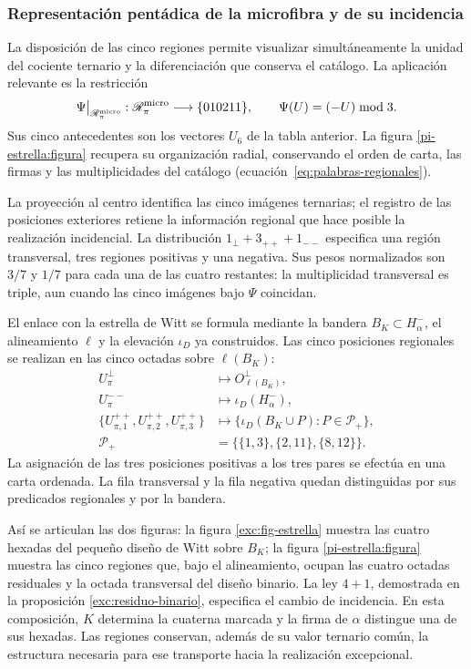 \subsubsection{Representación pentádica de la microfibra y de su incidencia}
\label{pi-estrella:desarrollo}

La disposición de las cinco regiones permite visualizar simultáneamente
la unidad del cociente ternario y la diferenciación que conserva el
catálogo. La aplicación relevante es la restricción
\[
 \Psi\big|_{\mathscr R_\pi^{\rm micro}}:
 \mathscr R_\pi^{\rm micro}\longrightarrow\{010211\},
 \qquad \Psi(U)=(-U)\bmod3.
\]
Sus cinco antecedentes son los vectores \(U_6\) de la tabla anterior.
La figura \ref{pi-estrella:figura} recupera su organización radial,
conservando el orden de carta, las firmas y las multiplicidades del
catálogo (ecuación~\eqref{eq:palabras-regionales}).



La proyección al centro identifica las cinco imágenes ternarias; el
registro de las posiciones exteriores retiene la información regional
que hace posible la realización incidencial. La distribución
\(1_\perp+3_{++}+1_{--}\) especifica una región transversal, tres
regiones positivas y una negativa. Sus pesos normalizados son
\(3/7\) y \(1/7\) para cada una de las cuatro restantes: la
multiplicidad transversal es triple, aun cuando las cinco imágenes bajo
\(\Psi\) coincidan.

El enlace con la estrella de Witt se formula mediante la bandera
\(B_K\subset H^-_\alpha\), el alineamiento \(\ell\) y la
elevación \(\iota_D\) ya construidos. Las cinco posiciones regionales
se realizan en las cinco octadas sobre \(\ell(B_K)\):
\[
\begin{aligned}
 U_\pi^\perp&\longmapsto O^\perp_{\ell(B_K)},\\
 U_\pi^{--}&\longmapsto\iota_D(H^-_\alpha),\\
 \{U_{\pi,1}^{++},U_{\pi,2}^{++},U_{\pi,3}^{++}\}
 &\longmapsto
 \{\iota_D(B_K\cup P):P\in\mathcal P_+\},\\
 \mathcal P_+&=\bigl\{\{1,3\},\{2,11\},\{8,12\}\bigr\}.
\end{aligned}
\]
La asignación de las tres posiciones positivas a los tres pares se
efectúa en una carta ordenada. La fila transversal y la fila negativa
quedan distinguidas por sus predicados regionales y por la bandera.

Así se articulan las dos figuras: la figura
\ref{exc:fig-estrella} muestra las cuatro hexadas del pequeño diseño
de Witt sobre \(B_K\); la figura \ref{pi-estrella:figura} muestra
las cinco regiones que, bajo el alineamiento, ocupan las cuatro octadas
residuales y la octada transversal del diseño binario. La ley
\(4+1\), demostrada en la proposición
\ref{exc:residuo-binario}, especifica el cambio de incidencia. En esta
composición, \(K\) determina la cuaterna marcada y la firma de
\(\alpha\) distingue una de sus hexadas. Las regiones conservan,
además de su valor ternario común, la estructura necesaria para ese
transporte hacia la realización excepcional.
